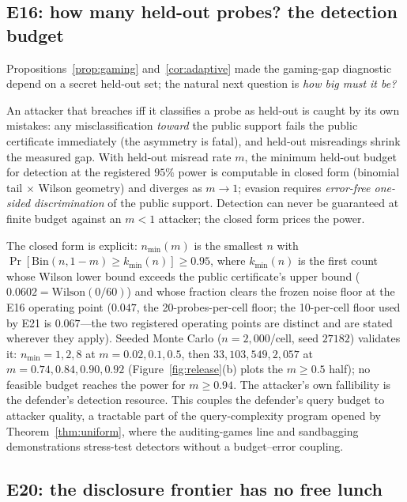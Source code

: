 \subsection{E16: how many held-out probes? the detection budget}\label{sec:budget}

Propositions~\ref{prop:gaming} and~\ref{cor:adaptive} made the gaming-gap
diagnostic depend on a secret held-out set; the natural next question is
\emph{how big must it be?}

\begin{proposition}\label{prop:budget}
An attacker that breaches iff it classifies a probe as held-out is caught by
its own mistakes: any misclassification \emph{toward} the public support fails
the public certificate immediately (the asymmetry is fatal), and held-out
misreadings shrink the measured gap. With held-out misread rate $m$, the
minimum held-out budget for detection at the registered $95\%$ power is
computable in closed form (binomial tail $\times$ Wilson geometry) and
diverges as $m\to1$; evasion requires \emph{error-free one-sided
discrimination} of the public support. Detection can never be guaranteed at
finite budget against an $m<1$ attacker; the closed form prices the power.
\end{proposition}

The closed form is explicit: $n_{\min}(m)$ is the smallest $n$ with
$\Pr[\mathrm{Bin}(n,1-m)\ge k_{\min}(n)]\ge0.95$, where $k_{\min}(n)$
is the first count whose Wilson lower bound exceeds the public
certificate's upper bound ($0.0602=\mathrm{Wilson}(0/60)$) and whose
fraction clears the frozen noise floor at the E16 operating point
($0.047$, the 20-probes-per-cell floor; the 10-per-cell floor used by E21
is $0.067$---the two registered operating points are distinct and are
stated wherever they apply). Seeded Monte Carlo
($n=2{,}000$/cell, seed $27182$) validates it: $n_{\min}=1,2,8$ at
$m=0.02,0.1,0.5$, then $33,103,549,2{,}057$ at
$m=0.74,0.84,0.90,0.92$ (Figure~\ref{fig:release}(b) plots the
$m\ge0.5$ half); no feasible budget reaches the power for $m\ge0.94$.
The attacker's own fallibility is the defender's
detection resource. This couples the defender's query budget to attacker
quality, a tractable part of the query-complexity program opened by
Theorem~\ref{thm:uniform}, where the auditing-games line
\cite{auditinggames2025} and sandbagging demonstrations
\cite{aisandbagging2025} stress-test detectors without a budget--error
coupling.

\subsection{E20: the disclosure frontier has no free lunch}\label{sec:frontier}

